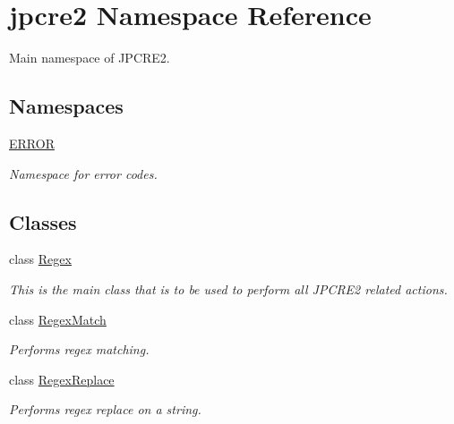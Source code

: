 \hypertarget{namespacejpcre2}{}\section{jpcre2 Namespace Reference}
\label{namespacejpcre2}


Main namespace of J\+P\+C\+R\+E2.  


\subsection*{Namespaces}
\begin{DoxyCompactItemize}
\item 
 \hyperlink{namespacejpcre2_1_1ERROR}{E\+R\+R\+OR}
\begin{DoxyCompactList}\small\item\em Namespace for error codes. \end{DoxyCompactList}\end{DoxyCompactItemize}
\subsection*{Classes}
\begin{DoxyCompactItemize}
\item 
class \hyperlink{classjpcre2_1_1Regex}{Regex}
\begin{DoxyCompactList}\small\item\em This is the main class that is to be used to perform all J\+P\+C\+R\+E2 related actions. \end{DoxyCompactList}\item 
class \hyperlink{classjpcre2_1_1RegexMatch}{Regex\+Match}
\begin{DoxyCompactList}\small\item\em Performs regex matching. \end{DoxyCompactList}\item 
class \hyperlink{classjpcre2_1_1RegexReplace}{Regex\+Replace}
\begin{DoxyCompactList}\small\item\em Performs regex replace on a string. \end{DoxyCompactList}\end{DoxyCompactItemize}
